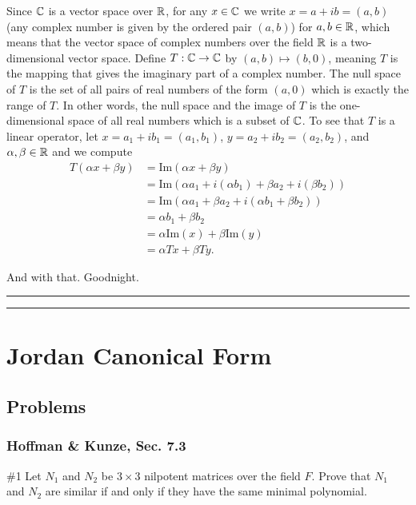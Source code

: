 \documentclass{article}
\begin{document}
	Since $\mathbb C$ is a vector space over $\mathbb R$, for any $x\in \mathbb C$ we write $x = a+ ib = (a, b)$ (any complex number is given by the ordered pair $(a,b)$) for 
	$a,b\in\mathbb R$, which means that the vector space of complex numbers over the field $\mathbb R$ is a two-dimensional vector space. Define $T:\mathbb C\to\mathbb C$ by
	 $(a,b) \mapsto (b,0)$, meaning $T$ is the mapping that gives the imaginary part of a complex number. The null space of $T$ is the set of all pairs
	  of real numbers of the form $(a,0)$ which is exactly the range of $T$. In other words, the null space and the image of $T$ is the one-dimensional space of 
	  all real numbers which is a subset of $\mathbb C$. To see that $T$ is a linear operator, let $x = a_1 + ib_1 = (a_1, b_1)$, $y = a_2 + ib_2 = (a_2, b_2)$, and
	  $\alpha, \beta\in\mathbb R$ and we compute 
	  	\begin{align*}
			T(\alpha x+ \beta y) & = \text{Im}(\alpha x+ \beta y)\\
						       & = \text{Im}(\alpha a_1 + i(\alpha b_1) + \beta a_2 + i (\beta b_2))\\
						       & = \text{Im}(\alpha a_1 + \beta a_2 + i(\alpha b_1 + \beta b_2))\\
						       & = \alpha b_1 + \beta b_2\\
						       & = \alpha \text{Im}(x) + \beta  \text{Im}(y)\\
						       & = \alpha Tx + \beta Ty.
		\end{align*}

And with that. Goodnight.\\

\hrule \vspace{2pt}
\hrule

\break 

\section{Jordan Canonical Form}

\subsection{Problems}

\subsubsection{Hoffman \& Kunze, Sec. 7.3}

\begin{problem}{\#1} Let $N_1$ and $N_2$ be $3 \times 3$ nilpotent matrices over the field $F$. Prove that $N_1$ and $N_2$ are similar if and only if they have the same minimal polynomial.
\end{problem}
\end{document}

